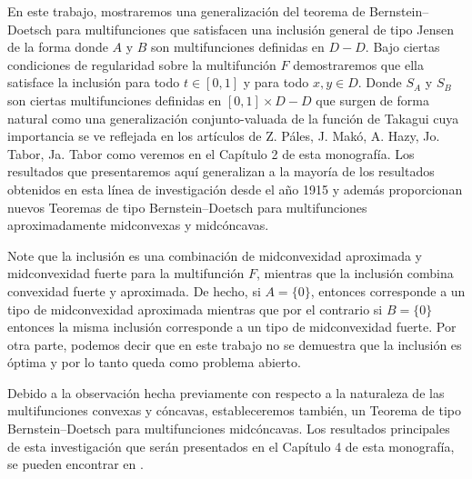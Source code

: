 En este trabajo, mostraremos una generalización del teorema de Bernstein--Doetsch 
para multifunciones que satisfacen una inclusión general de tipo Jensen
de la forma
donde $A$ y $B$ son multifunciones definidas en $D-D$. Bajo ciertas condiciones
de regularidad sobre la multifunción $F$ demostraremos que ella satisface
la inclusión
para todo $t\in [0,1]$ y para todo $x,y\in D$.
Donde $S_A$ y $S_B$ son ciertas multifunciones definidas en
$[0,1]\times D-D$ que surgen de forma natural como una 
generalización conjunto-valuada de la función de Takagui cuya 
importancia se ve reflejada en los artículos de Z. Páles, J. Makó,
A. Hazy, Jo. Tabor, Ja. Tabor \cite{MakPal10b,MakPal12a,TabTab09b,TabTab09a}
como veremos en el Capítulo 2 de esta monografía.
Los resultados que presentaremos aquí generalizan
 a la mayoría  de los resultados
obtenidos en esta línea de investigación desde el año 1915 y además
proporcionan nuevos Teoremas de tipo Bernstein--Doetsch
para multifunciones aproximadamente midconvexas y midcóncavas.

Note que la inclusión  es una combinación de 
midconvexidad aproximada y midconvexidad fuerte para la multifunción
$F$, mientras que la inclusión  combina convexidad fuerte y 
aproximada. De hecho, si $A=\{0\}$, entonces  corresponde
a un tipo de midconvexidad aproximada mientras que por el contrario
si $B=\{0\}$ entonces la misma inclusión corresponde a un tipo de 
midconvexidad fuerte. Por otra parte, podemos decir que en este
trabajo no se demuestra que la inclusión  es óptima
y por lo tanto queda como problema abierto.

Debido a la observación hecha previamente con respecto a la naturaleza
de las multifunciones convexas y cóncavas, estableceremos también, 
un Teorema de tipo Bernstein--Doetsch para multifunciones midcóncavas. Los resultados principales
de esta investigación que  serán presentados en el Capítulo 4 de esta monografía,
se pueden encontrar en \cite{GonNikPalRoa}.